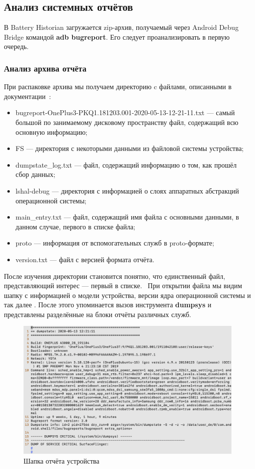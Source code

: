 \documentclass[a4paper,14pt]{extarticle} %
\begin{document}
	\subsection{Анализ системных отчётов}
	
	В Battery Historian загружается zip-архив, получаемый через Android Debug Bridge командой \textbf{adb bugreport}. Его следует проанализировать в первую очередь.
	
	\subsubsection{Анализ архива отчёта}
	
	При распаковке архива мы получаем директорию c файлами, описанными в документации~\parencite{BugreportFormat}:
	\begin{itemize}
		\item bugreport-OnePlus3-PKQ1.181203.001-2020-05-13-12-21-11.txt --- самый большой по занимаемому дисковому пространству файл, содержащий всю основную информацию;
		\item FS --- директория с некоторыми данными из файловой системы устройства;
		\item dumpstate\_log.txt --- файл, содержащий информацию о том, как прошёл сбор данных;
		\item lshal-debug --- директория с информацией о слоях аппаратных абстракций операционной системы;
		\item main\_entry.txt --- файл, содержащий имя файла с основными данными, в данном случае, первого в списке файла;
		\item proto --- информация от вспомогательных служб в proto-формате;
		\item version.txt --- файл с версией формата отчёта.
	\end{itemize}

	После изучения директории становится понятно, что единственный файл, представляющий интерес --- первый в списке.  При открытии файла мы видим шапку с информацией о модели устройства, версии ядра операционной системы и так далее \ris{\ref{fig:report_header}}. После этого упоминается вызов инструмента \textbf{dumpsys} и представлены разделённые на блоки отчёты различных служб. 
	
	\begin{figure}[!htb]
		\includegraphics[width=\textwidth]{report_header}
		\caption{Шапка отчёта устройства}
		\label{fig:report_header}
	\end{figure}
\end{document}
